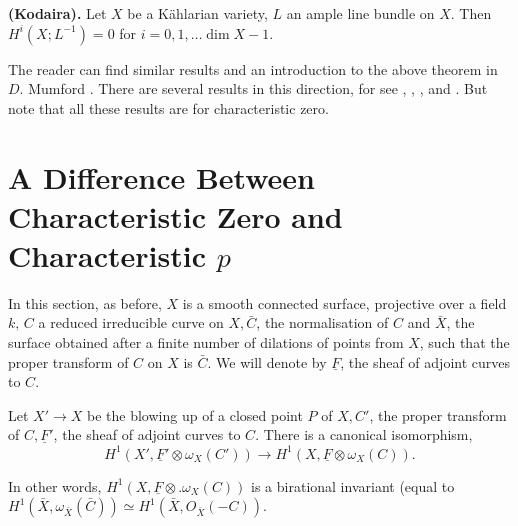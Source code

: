 \begin{THM*}
{\bf (Kodaira).} Let $X$ be a K\"ahlarian variety, $L$ an ample line
bundle on $X$. Then $H^i(X;L^{-1})=0$ for $i=0, 1,\ldots\dim X-1$.

The reader can find similar results and an introduction to the above
theorem in $D$. Mumford \cite{key3}. There are several results in this
direction, for \eg see \cite{key1}, \cite{key4}, \cite{key5}, \cite{key6}
and \cite{key7}. But note that all these results are for
characteristic zero.
\end{THM*}

\section[A Difference Between]{A Difference Between Characteristic
  Zero and Characteristic $p$}\label{chap2:sec10} In this section, as
before, $X$ is a smooth connected surface, projective over a field
$k, \,C$ a reduced irreducible curve on $X,\bar{C}$, the normalisation
of $C$ and $\bar{X}$, the surface obtained after a finite number of
dilations of points from $X$, such that the proper transform of $C$ on
$X$ is $\bar{C}$. We will denote by $\underline{F}$, the sheaf of
adjoint curves to $C$.
\begin{Prop*}
Let $X'\longrightarrow X$ be the blowing up of a closed point $P$ of
$X, C'$, the proper transform of $C,\underline{F}'$, the sheaf of
adjoint curves to $C$. There is a canonical isomorphism,
$$
H^1(X',\underline{F}'\otimes\omega_X(C'))\longrightarrow H^1(X,
\underline{F}\otimes\omega_X(C)).
$$

In other words, $H^1(X,\underline{F}\otimes.\omega_X(C))$ is a
birational invariant (equal to $H^1(\bar{X},\omega_{\bar{X}}(\bar{C}))
\simeq H^1(\bar{X}, O_{\bar{X}}(-C))$. 
\end{Prop*}

